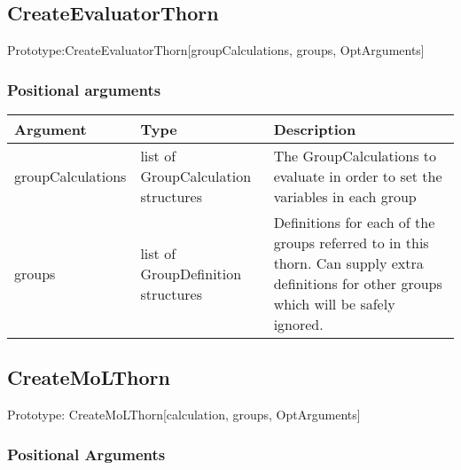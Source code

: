 \documentclass{report}
\newcommand{\tablewidth}{\textwidth}
\begin{document}
\subsection{CreateEvaluatorThorn}
\label{app:CreateEvaluatorThorn}

Prototype:CreateEvaluatorThorn[groupCalculations, groups, OptArguments]

\subsubsection{Positional arguments}

\begin{center}
\begin{tabularx}{\tablewidth}{|l|l|X|}
  \hline
  \bf Argument & \bf Type & \bf Description \\
  \hline
  groupCalculations
  & list of GroupCalculation structures 
  & The GroupCalculations to evaluate in order to
    set the variables in each group
  \\
  groups 
  & list of GroupDefinition structures 
  & Definitions for each of the groups referred to in this thorn. Can
  supply extra definitions for other groups which will be safely
  ignored. \\

  \hline
\end{tabularx}
\end{center}



\subsection{CreateMoLThorn}
\label{app:CreateMoLThorn}

Prototype: CreateMoLThorn[calculation, groups, OptArguments]

\subsubsection{Positional Arguments}
\end{document}
